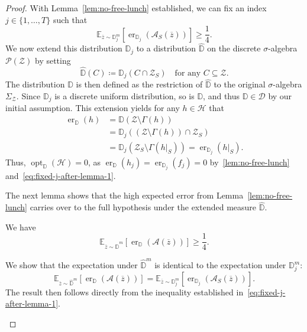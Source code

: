 \begin{proof}
    With Lemma~\ref{lem:no-free-lunch} established, we can fix an index $j \in \{1, \dots, T\}$ such that
    \begin{equation}
        \label{eq:fixed-j-after-lemma-1}
        \mathbb{E}_{\overline{z} \sim \mathbb{D}_j^m} \left[ \operatorname{er}_{\mathbb{D}_j}(\mathcal{A}_S(\overline{z})) \right] \ge \frac{1}{4}.
    \end{equation}
    We now extend this distribution $\mathbb{D}_j$ to a distribution $\widehat{\mathbb{D}}$ on the discrete $\sigma$-algebra $\mathcal{P}(\mathcal{Z})$ by setting
    \[
        \widehat{\mathbb{D}}(C) \coloneqq \mathbb{D}_j(C \cap \mathcal{Z}_S) \quad \text{for any } C \subseteq \mathcal{Z}.
    \]
    The distribution $\mathbb{D}$ is then defined as the restriction of $\widehat{\mathbb{D}}$ to the original $\sigma$-algebra $\Sigma_{\mathcal{Z}}$. Since $\mathbb{D}_j$ is a discrete uniform distribution, so is $\mathbb{D}$, and thus $\mathbb{D} \in \mathcal{D}$ by our initial assumption. This extension yields for any $h \in \mathcal{H}$ that
    \begin{align}
        \operatorname{er}_{\mathbb{D}}(h) &= \mathbb{D}(\mathcal{Z} \setminus \Gamma(h)) \nonumber \\
        &= \mathbb{D}_j((\mathcal{Z} \setminus \Gamma(h)) \cap \mathcal{Z}_S) \nonumber \\
        &= \mathbb{D}_j(\mathcal{Z}_S \setminus \Gamma(h|_S)) = \operatorname{er}_{\mathbb{D}_j}(h|_S). \label{eq:error-equivalence}
    \end{align}
    Thus, $\operatorname{opt}_{\mathbb{D}}(\mathcal{H}) = 0$, as $\operatorname{er}_{\mathbb{D}}(h_j) = \operatorname{er}_{\mathbb{D}_j}(f_j) = 0$ by~\ref{lem:no-free-lunch} and~\ref{eq:fixed-j-after-lemma-1}.

    The next lemma shows that the high expected error from Lemma~\ref{lem:no-free-lunch} carries over to the full hypothesis under the extended measure $\widehat{\mathbb{D}}$.

    \begin{lemma}
        \label{lem:full-error-bound-hat}
        We have
        \[
            \mathbb{E}_{\overline{z} \sim \widehat{\mathbb{D}}^m} \left[ \operatorname{er}_{\mathbb{D}}(\mathcal{A}(\overline{z})) \right] \ge \frac{1}{4}.
        \]
    \end{lemma}
    \begin{subproof}

        We show that the expectation under $\widehat{\mathbb{D}}^m$ is identical to the expectation under $\mathbb{D}_j^m$:
        \[
            \mathbb{E}_{\overline{z} \sim \widehat{\mathbb{D}}^m} \left[ \operatorname{er}_{\mathbb{D}}(\mathcal{A}(\overline{z})) \right] = \mathbb{E}_{\overline{z} \sim \mathbb{D}_j^m} \left[ \operatorname{er}_{\mathbb{D}_j}(\mathcal{A}_S(\overline{z})) \right].
        \]
        The result then follows directly from the inequality established in~\eqref{eq:fixed-j-after-lemma-1}.


\end{subproof}
\end{proof}
